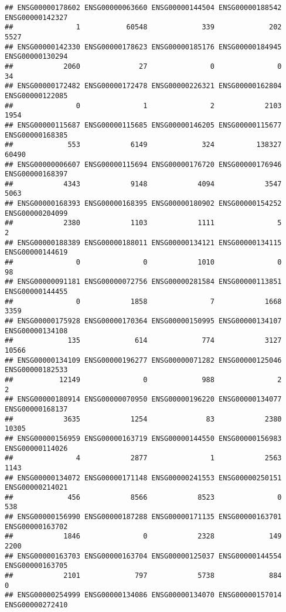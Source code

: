 \documentclass[
]{article}
\begin{document}
\begin{verbatim}
## ENSG00000178602 ENSG00000063660 ENSG00000144504 ENSG00000188542 ENSG00000142327 
##               1           60548             339             202            5527 
## ENSG00000142330 ENSG00000178623 ENSG00000185176 ENSG00000184945 ENSG00000130294 
##            2060              27               0               0              34 
## ENSG00000172482 ENSG00000172478 ENSG00000226321 ENSG00000162804 ENSG00000122085 
##               0               1               2            2103            1954 
## ENSG00000115687 ENSG00000115685 ENSG00000146205 ENSG00000115677 ENSG00000168385 
##             553            6149             324          138327           60490 
## ENSG00000006607 ENSG00000115694 ENSG00000176720 ENSG00000176946 ENSG00000168397 
##            4343            9148            4094            3547            5063 
## ENSG00000168393 ENSG00000168395 ENSG00000180902 ENSG00000154252 ENSG00000204099 
##            2380            1103            1111               5               2 
## ENSG00000188389 ENSG00000188011 ENSG00000134121 ENSG00000134115 ENSG00000144619 
##               0               0            1010               0              98 
## ENSG00000091181 ENSG00000072756 ENSG00000281584 ENSG00000113851 ENSG00000144455 
##               0            1858               7            1668            3359 
## ENSG00000175928 ENSG00000170364 ENSG00000150995 ENSG00000134107 ENSG00000134108 
##             135             614             774            3127           10566 
## ENSG00000134109 ENSG00000196277 ENSG00000071282 ENSG00000125046 ENSG00000182533 
##           12149               0             988               2               2 
## ENSG00000180914 ENSG00000070950 ENSG00000196220 ENSG00000134077 ENSG00000168137 
##            3635            1254              83            2380           10305 
## ENSG00000156959 ENSG00000163719 ENSG00000144550 ENSG00000156983 ENSG00000114026 
##               4            2877               1            2563            1143 
## ENSG00000134072 ENSG00000171148 ENSG00000241553 ENSG00000250151 ENSG00000214021 
##             456            8566            8523               0             538 
## ENSG00000156990 ENSG00000187288 ENSG00000171135 ENSG00000163701 ENSG00000163702 
##            1846               0            2328             149            2200 
## ENSG00000163703 ENSG00000163704 ENSG00000125037 ENSG00000144554 ENSG00000163705 
##            2101             797            5738             884               0 
## ENSG00000254999 ENSG00000134086 ENSG00000134070 ENSG00000157014 ENSG00000272410 

\end{verbatim}
\end{document}
